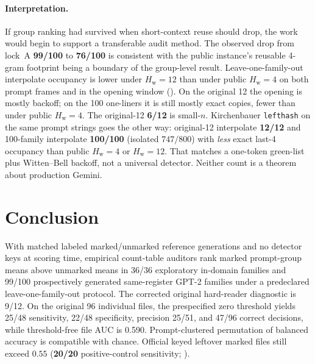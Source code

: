 \documentclass[11pt,a4paper]{article}
\theoremstyle{definition}
\newcommand{\Hw}{H_{\mathrm{w}}}
\begin{document}
\paragraph{Interpretation.}
If group ranking had survived when short-context reuse should drop, the
work would begin to support a transferable audit method. The observed
drop from lock~A \textbf{99/100} to \textbf{76/100} is consistent with
the public instance's reusable 4-gram footprint being a boundary of the
group-level result. Leave-one-family-out interpolate occupancy is lower
under $\Hw=12$ than under public $\Hw=4$ on both prompt frames and in
the opening window (). On the original 12 the opening is
mostly backoff; on the 100 one-liners it is still mostly exact copies,
fewer than under public $\Hw=4$. The
original-12 \textbf{6/12} is small-$n$. Kirchenbauer
\texttt{lefthash} on the same prompt strings goes the other way:
original-12 interpolate \textbf{12/12} and 100-family interpolate
\textbf{100/100} (isolated $747/800$) with \textit{less} exact last-4
occupancy than public $\Hw=4$ or $\Hw=12$. That matches a one-token
green-list plus Witten--Bell backoff, not a universal detector.
Neither count is a theorem about production Gemini.

\FloatBarrier
\section{Conclusion}
\label{sec:conclusion}

With matched labeled marked/unmarked reference generations and no
detector keys at scoring time, empirical count-table auditors rank
marked prompt-group means above unmarked means in 36/36 exploratory
in-domain families and 99/100 prospectively generated same-register
GPT-2 families under a predeclared leave-one-family-out protocol. The
corrected original hard-reader diagnostic is 9/12. On the original 96
individual files, the prespecified zero threshold yields 25/48
sensitivity, 22/48 specificity, precision 25/51, and 47/96 correct
decisions, while threshold-free file AUC is 0.590. Prompt-clustered
permutation of balanced accuracy is compatible with chance. Official
keyed leftover marked files still exceed $0.55$ (\textbf{20/20}
positive-control sensitivity; ).
\end{document}
